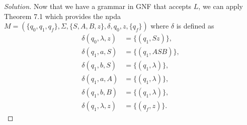\documentclass[ 12pt ]{article}
\begin{document}
\begin{enumerate}
\begin{proof}[Solution]
			Now that we have a grammar in GNF that accepts $L$, we can apply Theorem 7.1 which provides the npda $M = (\{ q_0, q_1, q_f \}, \Sigma, \{ S, A, B, z \}, \delta, q_0, z,
			\{ q_f \})$ where $\delta$ is defined as
			\begin{align*}
				\delta (q_0, \lambda, z) &= \{(q_1, Sz)\}, \\
				\delta (q_1, a, S) &= \{(q_1, ASB)\}, \\
				\delta (q_1, b, S) &= \{(q_1, \lambda)\}, \\
				\delta (q_1, a, A) &= \{(q_1, \lambda)\}, \\
				\delta (q_1, b, B) &= \{(q_1, \lambda)\}, \\
				\delta (q_1, \lambda, z) &= \{(q_f, z)\}.
			\end{align*}
		\end{proof}
\end{enumerate}
\end{document}
